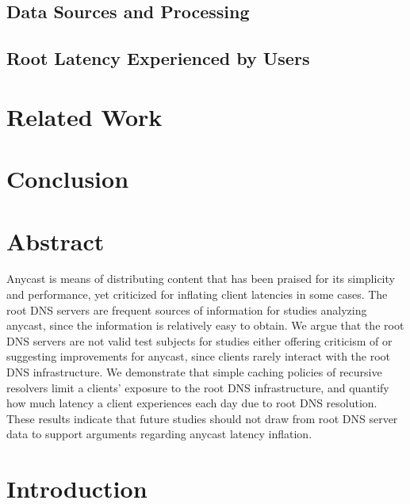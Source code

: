 \documentclass[sigconf,nonacm,10pt]{acmart}
\begin{document}
\subsection{Data Sources and
Processing}\label{data-sources-and-processing}

\subsection{Root Latency Experienced by
Users}\label{root-latency-experienced-by-users}

\section{Related Work}\label{related-work}

\section{Conclusion}\label{conclusion}

\fi

\section*{Abstract}\label{abstract-1}

Anycast is means of distributing content that has been praised for its
simplicity and performance, yet criticized for inflating client
latencies in some cases. The root DNS servers are frequent sources of
information for studies analyzing anycast, since the information is
relatively easy to obtain. We argue that the root DNS servers are not
valid test subjects for studies either offering criticism of or
suggesting improvements for anycast, since clients rarely interact with
the root DNS infrastructure. We demonstrate that simple caching policies
of recursive resolvers limit a clients' exposure to the root DNS
infrastructure, and quantify how much latency a client experiences each
day due to root DNS resolution. These results indicate that future
studies should not draw from root DNS server data to support arguments
regarding anycast latency inflation.

\section{Introduction}\label{introduction-1}
\end{document}
